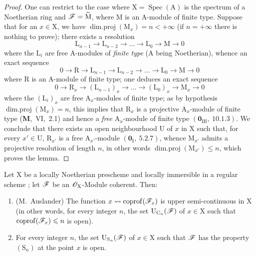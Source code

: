 \begin{proof}
One can restrict to the case where $\mathrm{X}=\operatorname{Spec}(\mathrm{A})$ is the spectrum of a Noetherian ring
and $\mathscr{F}=\widetilde{\mathrm{M}}$, where $\mathrm{M}$ is an $\mathrm{A}$-module of finite type. Suppose that for an $x\in\mathrm{X}$, we have
$\operatorname{dim.proj}(\mathrm{M}_x)=n<+\infty$ (if $n=+\infty$ there is nothing to prove); there exists a resolution
\[
  \mathrm{L}_{n-1}\to\mathrm{L}_{n-2}\to\ldots\to\mathrm{L}_0\to\mathrm{M}\to 0
\]
where the $\mathrm{L}_i$ are free $\mathrm{A}$-modules of \emph{finite type} ($\mathrm{A}$ being Noetherian), whence an exact sequence
\[
  0\to\mathrm{R}\to\mathrm{L}_{n-1}\to\mathrm{L}_{n-2}\to\ldots\to\mathrm{L}_0\to\mathrm{M}\to 0
\]
where $\mathrm{R}$ is an $\mathrm{A}$-module of finite type; one deduces an exact sequence
\[
  0\to\mathrm{R}_x\to(\mathrm{L}_{n-1})_x\to\ldots\to(\mathrm{L}_0)_x\to\mathrm{M}_x\to 0
\]
where the $(\mathrm{L}_i)_x$ are free $\mathrm{A}_x$-modules of finite type; as by hypothesis
$\operatorname{dim.proj}(\mathrm{M}_x)=n$, this implies that $\mathrm{R}_x$ is a projective $\mathrm{A}_x$-module of finite type
(\textbf{M},~VI,~2.1) and hence a \emph{free} $\mathrm{A}_x$-module of finite type $(\mathbf{0}_{\mathrm{III}},~10.1.3)$. We conclude
that there exists an open neighbourhood $\mathrm{U}$ of $x$ in $\mathrm{X}$ such that, for every $x'\in\mathrm{U}$, $\mathrm{R}_{x'}$ is a
free $\mathrm{A}_{x'}$-module $(\mathbf{0}_\mathrm{I},~5.2.7)$, whence $\mathrm{M}_{x'}$ admits a projective resolution of length $n$,
in other words $\operatorname{dim.proj}(\mathrm{M}_{x'})\leqslant n$, which proves the lemma.
\end{proof}

\begin{proposition}[6.11.2]
\label{IV.6.11.2}
Let $\mathrm{X}$ be a locally Noetherian prescheme and locally immersible
in a regular scheme ; let $\mathscr{F}$ be an $\mathscr{O}_\mathrm{X}$-Module coherent. Then:
\begin{enumerate}[label=\textup{(\roman*)}]
  \item \textnormal{(M.~Auslander)} The function $x\leadsto\operatorname{coprof}(\mathscr{F}_x)$ is upper semi-continuous in $\mathrm{X}$
\textup{(in other words, for every integer $n$, the set $\mathrm{U}_{\mathrm{C}_n}(\mathscr{F})$ of $x\in\mathrm{X}$ such that $\operatorname{coprof}(\mathscr{F}_x)\leqslant n$
is} open).
  \item For every integer $n$, the set $\mathrm{U}_{\mathrm{S}_n}(\mathscr{F})$ of $x\in\mathrm{X}$ such that $\mathscr{F}$ has the property $(\mathrm{S}_n)$
at the point $x$ is open.
\end{enumerate}
\end{proposition}

